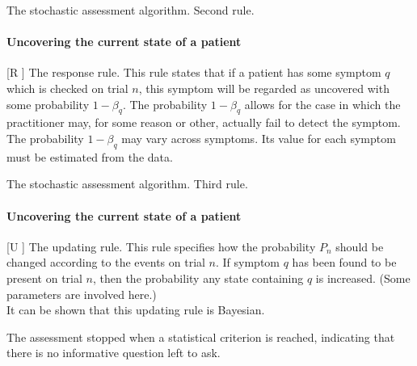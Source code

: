 \documentclass{beamer}
\def\wl{\vskip 4mm}
\def\bb{\beta}
\begin{document}
\begin{frame}{The stochastic assessment algorithm. Second rule.}
\framesubtitle{Uncovering the current state of a patient}
\center

\begin{roster}
\item[[R\hspace{-.18cm}]] {\sc The response rule.} This rule states that if a patient has some symptom $q$ which is  checked on trial $n$, this symptom  will be regarded as uncovered with some probability $1-\bb_q$. The probability $1-\bb_q$ allows for the case in which the practitioner may, for some reason or other, actually fail to detect the symptom. The probability $1-\bb_q$ may vary across symptoms. Its value for each symptom must be estimated from the data.  
\end{roster}
\vspace{.5cm}

\end{frame}
\begin{frame}{The stochastic assessment algorithm. Third rule.}
\framesubtitle{Uncovering the current state of a patient}
\center

\begin{roster}
\item[[U\hspace{-.18cm}]] {\sc The updating rule.} This rule specifies how the probability $P_n$ should be changed according to the events on trial $n$.  If symptom $q$ has been found to be present on trial $n$, then the probability any  state containing $q$ is increased. (Some parameters are involved here.)\\   It can be shown that this updating rule is Bayesian.  

\wl
\item[] The assessment stopped when a statistical criterion is reached, indicating that there is no informative question left to ask.
\end{roster}
\vspace{.5cm}

\end{frame}
\end{document}
